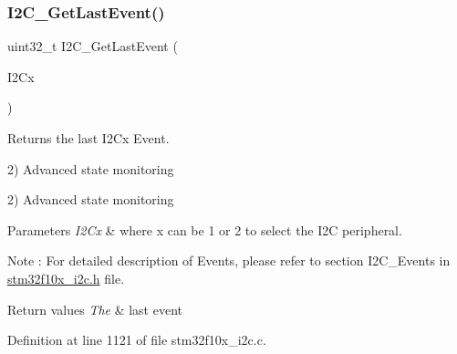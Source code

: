 \mbox{\label{group___i2_c___exported___functions_ga29237aea9b5a3ead33167e1d027e9f1a}} 
\subsubsection{\texorpdfstring{I2\+C\+\_\+\+Get\+Last\+Event()}{I2C\_GetLastEvent()}}
{\footnotesize\ttfamily uint32\+\_\+t I2\+C\+\_\+\+Get\+Last\+Event (\begin{DoxyParamCaption}\item[{\hyperlink{struct_i2_c___type_def}{I2\+C\+\_\+\+Type\+Def} $\ast$}]{I2\+Cx }\end{DoxyParamCaption})}



Returns the last I2\+Cx Event. 

2) Advanced state monitoring

2) Advanced state monitoring 
\begin{DoxyParams}{Parameters}
{\em I2\+Cx} & where x can be 1 or 2 to select the I2C peripheral.\\
\hline
\end{DoxyParams}
\begin{DoxyNote}{Note}
\+: For detailed description of Events, please refer to section I2\+C\+\_\+\+Events in \hyperlink{stm32f10x__i2c_8h}{stm32f10x\+\_\+i2c.\+h} file.
\end{DoxyNote}

\begin{DoxyRetVals}{Return values}
{\em The} & last event \\
\hline
\end{DoxyRetVals}


Definition at line 1121 of file stm32f10x\+\_\+i2c.\+c.

\mbox{\label{group___i2_c___exported___functions_ga7bf75e7c27c0e1d73e70fc0e1c7cd1dd}} 
